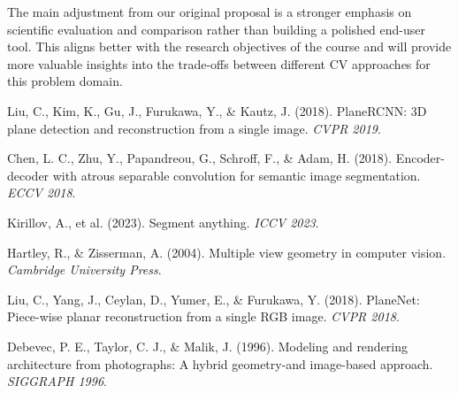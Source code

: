 \documentclass[11pt]{article}
\begin{document}
The main adjustment from our original proposal is a stronger emphasis on scientific evaluation and comparison rather than building a polished end-user tool. This aligns better with the research objectives of the course and will provide more valuable insights into the trade-offs between different CV approaches for this problem domain.


\begin{thebibliography}{9}

Liu, C., Kim, K., Gu, J., Furukawa, Y., \& Kautz, J. (2018).
PlaneRCNN: 3D plane detection and reconstruction from a single image.
\textit{CVPR 2019}.

Chen, L. C., Zhu, Y., Papandreou, G., Schroff, F., \& Adam, H. (2018).
Encoder-decoder with atrous separable convolution for semantic image segmentation.
\textit{ECCV 2018}.

Kirillov, A., et al. (2023).
Segment anything.
\textit{ICCV 2023}.

Hartley, R., \& Zisserman, A. (2004).
Multiple view geometry in computer vision.
\textit{Cambridge University Press}.

Liu, C., Yang, J., Ceylan, D., Yumer, E., \& Furukawa, Y. (2018).
PlaneNet: Piece-wise planar reconstruction from a single RGB image.
\textit{CVPR 2018}.

Debevec, P. E., Taylor, C. J., \& Malik, J. (1996).
Modeling and rendering architecture from photographs: A hybrid geometry-and image-based approach.
\textit{SIGGRAPH 1996}.

\end{thebibliography}
\end{document}
